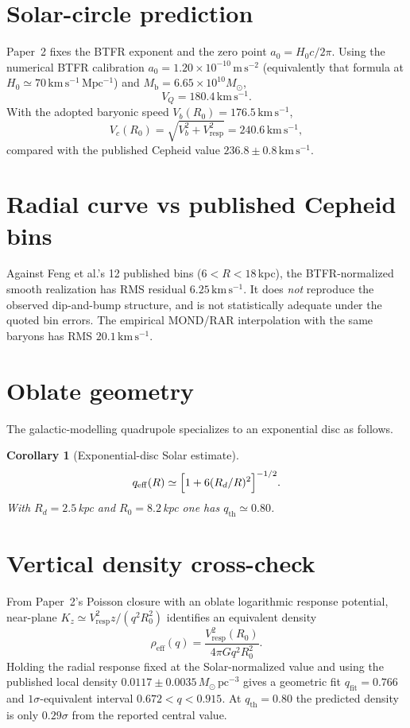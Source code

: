 \documentclass[11pt]{article}
\newtheorem{corollary}[theorem]{Corollary}
\theoremstyle{definition}
\theoremstyle{remark}
\newcommand{\Msun}{M_\odot}
\newcommand{\kms}{\mathrm{km\,s^{-1}}}
\newcommand{\Mb}{M_{\mathrm{b}}}
\newcommand{\qeff}{q_{\mathrm{eff}}}
\newcommand{\qth}{q_{\mathrm{th}}}
\newcommand{\qfit}{q_{\mathrm{fit}}}
\begin{document}
\section{Solar-circle prediction}
Paper~2 fixes the BTFR exponent and the zero point $a_0=H_0c/2\pi$.
Using the numerical BTFR calibration $a_0=1.20\times10^{-10}\,\mathrm{m\,s^{-2}}$ (equivalently that formula at $H_0\simeq70\,\mathrm{km\,s^{-1}\,Mpc^{-1}}$) and $\Mb=6.65\times10^{10}\Msun$,
\[
  V_Q=180.4\,\kms.
\]
With the adopted baryonic speed $V_b(R_0)=176.5\,\kms$,
\[
  V_c(R_0)=\sqrt{V_b^2+V_{\mathrm{resp}}^2}=240.6\,\kms,
\]
compared with the published Cepheid value $236.8\pm0.8\,\kms$.

\section{Radial curve vs published Cepheid bins}
Against Feng et al.'s 12 published bins ($6<R<18\,$kpc), the BTFR-normalized smooth realization has RMS residual $6.25\,\kms$.
It does \emph{not} reproduce the observed dip-and-bump structure, and is not statistically adequate under the quoted bin errors.
The empirical MOND/RAR interpolation with the same baryons has RMS $20.1\,\kms$.

\section{Oblate geometry}
The galactic-modelling quadrupole specializes to an exponential disc as follows.

\begin{corollary}[Exponential-disc Solar estimate]
\[
  \qeff(R)\simeq\Bigl[1+6(R_d/R)^2\Bigr]^{-1/2}.
\]
With $R_d=2.5\,$kpc and $R_0=8.2\,$kpc one has $\qth\simeq0.80$.
\end{corollary}

\section{Vertical density cross-check}
From Paper~2's Poisson closure with an oblate logarithmic response potential, near-plane $K_z\simeq V_{\mathrm{resp}}^2 z/(q^2 R_0^2)$ identifies an equivalent density
\[
  \rho_{\mathrm{eff}}(q)=\frac{V_{\mathrm{resp}}^2(R_0)}{4\pi G q^2 R_0^2}.
\]
Holding the radial response fixed at the Solar-normalized value and using the published local density $0.0117\pm0.0035\,\Msun\,\mathrm{pc}^{-3}$
gives a geometric fit $\qfit=0.766$ and $1\sigma$-equivalent interval $0.672<q<0.915$.
At $\qth=0.80$ the predicted density is only $0.29\sigma$ from the reported central value.
\end{document}
